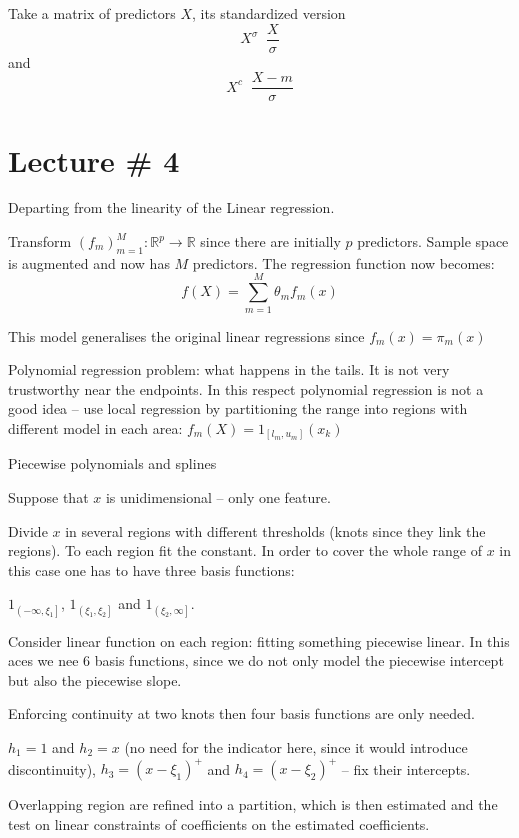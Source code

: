 \documentclass[a4paper]{article}
\newcommand{\clo}[1]{{\left [ #1 \right ]}}
\newcommand{\ploc}[1]{{\left ( #1 \right ]}}
\newcommand{\brac}[1]{{\left ( #1 \right )}}
\newcommand{\Real}{\mathbb{R}}
\newcommand{\defn}{\mathop{\overset{\Delta}{=}}\nolimits}
\begin{document}

Take a matrix of predictors $X$, its standardized version \[X^\sigma \defn \frac{X}{\sigma}\]
and \[X^c \defn \frac{X-m}{\sigma}\]



\section{Lecture \# 4} %
\label{sec:lecture_4}
Departing from the linearity of the Linear regression.

Transform $\brac{f_m}_{m=1}^M:\Real^p \to \Real$ since there are initially $p$ predictors.
Sample space is augmented and now has $M$ predictors. The regression function now becomes:
\[f(X) = \sum_{m=1}^M \theta_m f_m(x)\]

This model generalises the original linear regressions since $f_m(x) = \pi_m(x)$ 

Polynomial regression problem: what happens in the tails. It is not very trustworthy near the endpoints.
In this respect polynomial regression is not a good idea -- use local regression by partitioning the range
into regions with different model in each area: $f_m(X) = 1_{\clo{l_m, u_m}}(x_k)$

Piecewise polynomials and splines

Suppose that $x$ is unidimensional -- only one feature.

Divide $x$ in several regions with different thresholds (knots since they link the regions).
To each region fit the constant. In order to cover the whole range of $x$ in this case one has to have three basis functions:

$1_{\ploc{-\infty, \xi_1}}$, $1_{\ploc{\xi_1, \xi_2}}$ and $1_{\ploc{\xi_2, \infty}}$.

Consider linear function on each region: fitting something piecewise linear. In this aces we nee 6 basis functions, since we do not only model the piecewise intercept but also the piecewise slope.

Enforcing continuity at two knots then four basis functions are only needed.

$h_1 = 1$ and $h_2 = x$ (no need for the indicator here, since it would introduce discontinuity), $h_3 = \brac{x-\xi_1}^+$ and $h_4 = \brac{x-\xi_2}^+$ -- fix their intercepts.

Overlapping region are refined into a partition, which is then estimated and the test on linear constraints of coefficients on the estimated coefficients.
\end{document}
